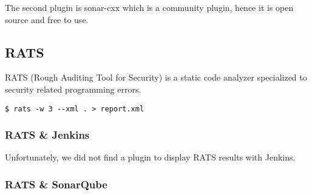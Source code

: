 The second plugin is sonar-cxx which is a community plugin, hence it is open source and free to use.

\subsection{RATS}
RATS (Rough Auditing Tool for Security) is a static code analyzer specialized to security related programming errors.

\begin{lstlisting}[caption={Bash command to run RATS},label={lst:rats}]
$ rats -w 3 --xml . > report.xml
\end{lstlisting}

\subsubsection{RATS \& Jenkins}
Unfortunately, we did not find a plugin to display RATS results with Jenkins.

\subsubsection{RATS \& SonarQube}